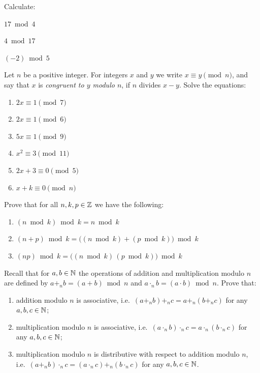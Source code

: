 \begin{exercise}
Calculate:
\begin{enumerate*}[label=\alph*), itemjoin={\qquad}]
\item $17 \bmod 4$
\item $4 \bmod 17$
\item $(-2) \bmod 5$
\end{enumerate*}
\end{exercise}

\begin{exercise}
Let $n$ be a positive integer. For integers $x$ and $y$ we write $x \equiv y \pmod n$, and say that $x$ is
\emph{congruent to $y$ modulo $n$}, if $n$ divides $x-y$. Solve the equations:
\begin{enumerate}[label=\alph*)]
\item $2x \equiv 1 \pmod 7$
\item $2x \equiv 1 \pmod 6$
\item $5x \equiv 1 \pmod 9$
\item $x^2 \equiv 3 \pmod{11}$
\item $2x+3 \equiv 0 \pmod 5$
\item $x+k \equiv 0 \pmod n$
\end{enumerate}
\end{exercise}

\begin{exercise}
Prove that for all $n,k,p\in \mathbb{Z}$ we have the following:
\begin{enumerate}[label=\alph*)]
\item $(n \bmod k) \bmod k = n \bmod k$
\item $(n+p) \bmod k = \big((n \bmod k) + (p \bmod k)\big) \bmod k$
\item $(np) \bmod k = \big((n \bmod k)\,(p \bmod k)\big) \bmod k$
\end{enumerate}
\end{exercise}

\begin{exercise}
Recall that for $a,b\in\mathbb{N}$ the operations of addition and multiplication modulo $n$ are defined by
$a +_n b = (a+b) \bmod n$ and $a \cdot_n b = (a\cdot b) \bmod n$. Prove that:
\begin{enumerate}[label=\alph*)]
\item addition modulo $n$ is associative, i.e.\ $(a +_n b) +_n c = a +_n (b +_n c)$ for any $a,b,c\in\mathbb{N}$;
\item multiplication modulo $n$ is associative, i.e.\ $(a \cdot_n b) \cdot_n c = a \cdot_n (b \cdot_n c)$
for any $a,b,c\in\mathbb{N}$;
\item multiplication modulo $n$ is distributive with respect to addition modulo $n$, i.e.\
$(a +_n b) \cdot_n c = (a \cdot_n c) +_n (b \cdot_n c)$ for any $a,b,c\in\mathbb{N}$.
\end{enumerate}
\end{exercise}

